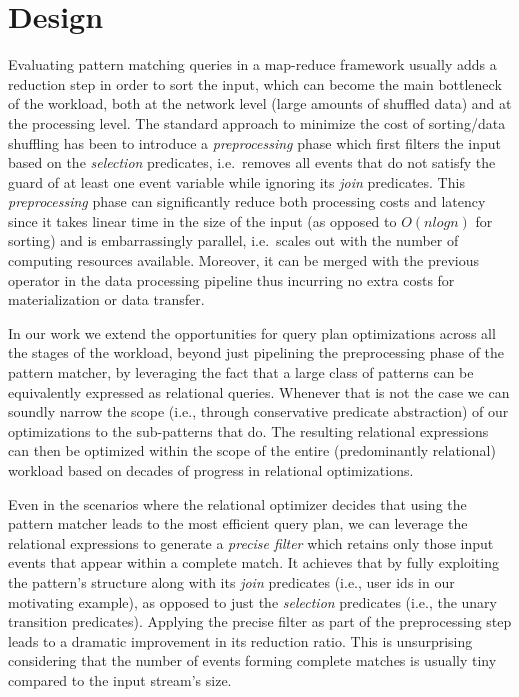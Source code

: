 
\section{Design}
\label{sec:design}

Evaluating pattern matching queries in a map-reduce framework usually 
adds a reduction step in order to sort the input, which can become the main 
bottleneck of the workload, both at the network level (large amounts of 
shuffled data) and at the processing level.
The standard approach to minimize the cost of sorting/data shuffling has been 
to introduce a {\em preprocessing} phase which first filters the input based on 
the {\em selection} predicates, i.e.\ removes all events that do not satisfy 
the guard of at least one event variable while ignoring its {\em join} 
predicates.
This {\em preprocessing} phase can significantly reduce both processing costs 
and latency since it takes linear time in the size of the input (as opposed to 
$O(nlogn)$ for sorting) and is embarrassingly parallel, i.e.\ scales out with 
the number of computing resources available.
Moreover, it can be merged with the previous operator in the data processing 
pipeline thus incurring no extra costs for materialization or data transfer.    



In our work we extend the opportunities for query plan optimizations across all 
the stages of the workload, beyond just pipelining the preprocessing phase of 
the pattern matcher, by leveraging the fact that a large class of patterns can 
be equivalently expressed as relational queries.
Whenever that is not the case we can soundly narrow the scope (i.e., through conservative predicate abstraction) of our optimizations to 
the sub-patterns that do.
The resulting relational expressions can then be optimized within the scope of 
the entire (predominantly relational) workload based on decades of progress in 
relational optimizations.  


Even in the scenarios where the relational optimizer decides that using the
pattern matcher leads to the most efficient query plan, we can leverage the
relational expressions to generate a {\em precise filter} which retains only
those input events that appear within a complete match.  It achieves that by
fully exploiting the pattern's structure along with its {\em join} predicates
(i.e., user ids in our motivating example), as opposed to just the {\em
  selection} predicates (i.e., the unary transition predicates).  Applying the
precise filter as part of the preprocessing step leads to a dramatic improvement
in its reduction ratio.  This is unsurprising considering that the number of
events forming complete matches is usually tiny compared to the input stream's
size.
 

